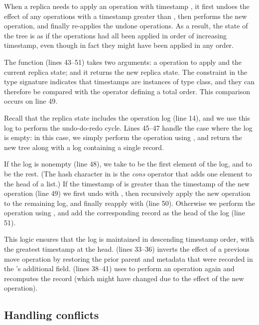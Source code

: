 \documentclass[sigplan,anonymous]{acmart}
\begin{document}
When a replica needs to apply an operation with timestamp , it first undoes the effect of any operations with a timestamp greater than , then performs the new operation, and finally re-applies the undone operations.
As a result, the state of the tree is as if the operations had all been applied in order of increasing timestamp, even though in fact they might have been applied in any order.

The  function (lines 43--51) takes two arguments: a  operation to apply and the current replica state; and it returns the new replica state.
The constraint  in the type signature indicates that timestamps  are instances of  type class, and they can therefore be compared with the \isa{<} operator defining a total order.
This comparison occurs on line 49.

Recall that the replica state includes the operation log (line 14), and we use this log to perform the undo-do-redo cycle.
Lines 45--47 handle the case where the log is empty: in this case, we simply perform the operation using , and return the new tree along with a log containing a single  record.

If the log is nonempty (line 48), we take  to be the first element of the log, and  to be the rest.
(The hash character in  is the \emph{cons} operator that adds one element to the head of a list.)
If the timestamp of  is greater than the timestamp of the new operation (line 49) we first undo  with , then recursively apply the new operation to the remaining log, and finally reapply  with  (line 50).
Otherwise we perform the operation using , and add the corresponding  record as the head of the log (line 51).

This logic ensures that the log is maintained in descending timestamp order, with the greatest timestamp at the head.
 (lines 33--36) inverts the effect of a previous move operation by restoring the prior parent and metadata that were recorded in the 's additional field.
 (lines 38--41) uses  to perform an operation again and recomputes the  record (which might have changed due to the effect of the new operation).

\subsection{Handling conflicts}\label{sec:conflicts}
\end{document}
